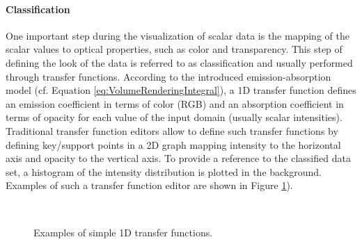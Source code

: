 \paragraph{Classification}
One important step during the visualization of scalar data is the mapping of the scalar values to optical properties, such as color and transparency.
This step of defining the look of the data is referred to as classification and usually performed through transfer functions.
According to the introduced emission-absorption model (cf. Equation \ref{eq:VolumeRenderingIntegral}), a  1D transfer function defines an emission coefficient in terms of color (RGB) and an absorption coefficient in terms of opacity for each value of the input domain (usually scalar intensities).
Traditional transfer function editors allow to define such transfer functions by defining key/support points in a 2D graph mapping intensity to the horizontal axis and opacity to the vertical axis.
To provide a reference to the classified data set, a histogram of the intensity distribution is plotted in the background.
Examples of such a transfer function editor are shown in Figure \ref{fig:background:1dtf}).

\begin{figure}[ht]
	\centering
	\\
	\caption{Examples of simple 1D transfer functions. }
	\label{fig:background:1dtf}
\end{figure}

